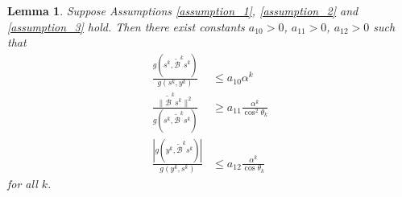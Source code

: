 \documentclass[12pt,a4paper,draft]{article}  %
\newtheorem{lemma}{Lemma}[section]
\theoremstyle{definition}
\numberwithin{equation}{section}
\begin{document}
\begin{lemma}\label{lemma_8}
        Suppose Assumptions \ref{assumption_1}, \ref{assumption_2} and \ref{assumption_3} hold. Then there exist constants $a_{10}>0$, $a_{11}>0$, $a_{12}>0$ such that
        \begin{align}
                \frac{g(s^k,\tilde{\mathcal{B}}^ks^k)}{g(s^k,y^k)} &\leq a_{10}\alpha^k \label{ineq_8.1}\\
                \frac{\|\tilde{\mathcal{B}}^ks^k\|^2}{g(s^k,\tilde{\mathcal{B}}^ks^k)} &\geq a_{11}\frac{\alpha^k}{\cos^2\theta_k} \label{ineq_8.2}\\
                \frac{|g(y^k,\tilde{\mathcal{B}}^ks^k)|}{g(y^k,s^k)} &\leq a_{12}\frac{\alpha^k}{\cos\theta_k} \label{ineq_8.3}
        \end{align}
        for all $k$.
\end{lemma}
\end{document}
